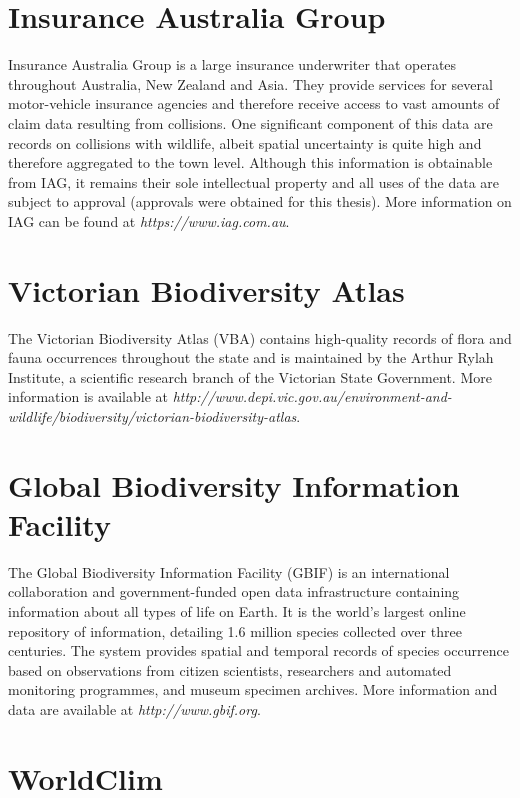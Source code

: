 \section{Insurance Australia Group}

Insurance Australia Group is a large insurance underwriter that operates throughout Australia, New Zealand and Asia. They provide services for several motor-vehicle insurance agencies and therefore receive access to vast amounts of claim data resulting from collisions. One significant component of this data are records on collisions with wildlife, albeit spatial uncertainty is quite high and therefore aggregated to the town level. Although this information is obtainable from IAG, it remains their sole intellectual property and all uses of the data are subject to approval (approvals were obtained for this thesis). More information on IAG can be found at \textit{https://www.iag.com.au}.

\section{Victorian Biodiversity Atlas}

The Victorian Biodiversity Atlas (VBA) contains high-quality records of flora and fauna occurrences throughout the state and is maintained by the Arthur Rylah Institute, a scientific research branch of the Victorian State Government. More information is available at \textit{http://www.depi.vic.gov.au/environment-and-wildlife/biodiversity/victorian-biodiversity-atlas}.

\section{Global Biodiversity Information Facility}

The Global Biodiversity Information Facility (GBIF) is an international collaboration and government-funded open data infrastructure containing information about all types of life on Earth. It is the world's largest online repository of information, detailing 1.6 million species collected over three centuries. The system provides spatial and temporal records of species occurrence based on observations from citizen scientists, researchers and automated monitoring programmes, and museum specimen archives. More information and data are available at \textit{http://www.gbif.org}.

\section{WorldClim}

